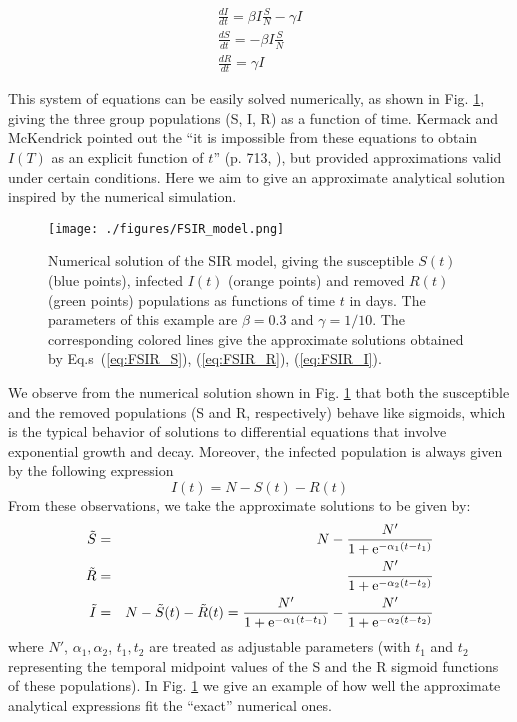 \documentclass[aps,preprint]{revtex4}
\newcommand{\eexp}{{\rm e}}
\newcommand{\Stild}{\tilde{S}}
\newcommand{\Rtild}{{\tilde R}}
\newcommand{\Itild}{{\tilde I}}
\begin{document}
\begin{eqnarray}
\frac{dI}{dt} = \beta I \frac{S}{N} - \gamma I  
\label{eq:SIR_I}
\\
\frac{dS}{dt} = - \beta I \frac{S}{N} 
\label{eq:SIR_S}
\\
\frac{dR}{dt} = \gamma I 
\label{eq:SIR_R}
\end{eqnarray}

This system of equations can be easily solved numerically, as shown in Fig. \ref{fig:FSIR_model}, 
giving the three group populations (S, I, R) as a function of time. 
Kermack and McKendrick pointed out the ``it is impossible from these equations 
to obtain $I(T)$ as an explicit function of $t$'' (p. 713, \cite{Kermack_1927}), 
but provided approximations valid under certain conditions. 
Here we aim to give an approximate analytical solution inspired by the 
numerical simulation.
\begin{figure}[h]
\texttt{[image: ./figures/FSIR\_model.png]}
\caption{
\small{
Numerical solution of the SIR model, giving the susceptible $S(t)$ (blue points), 
infected $I(t)$ (orange points)
and removed $R(t)$ (green points) populations as functions of time $t$ in days. 
The parameters of this example are $\beta=0.3$ and $\gamma = 1/10$. 
The corresponding colored lines give the approximate solutions obtained by Eq.s~(\ref{eq:FSIR_S}), 
(\ref{eq:FSIR_R}), (\ref{eq:FSIR_I}). 
}
}
\label{fig:FSIR_model}
\end{figure}

We observe from the numerical solution shown in Fig. \ref{fig:FSIR_model}
that both the susceptible and the removed populations (S and R, respectively) 
behave like sigmoids, which is the typical behavior of solutions to 
differential equations that involve exponential growth and decay. 
Moreover, the infected population is always given by the following expression
\begin{equation}
I(t) = N - S(t) - R(t)
\label{eq:infect-S-R}
\end{equation}
From these observations, we take the approximate solutions to be given by:
\begin{eqnarray}
\Stild & = & N - \frac{N'}{1+\eexp^{-\alpha_1(t-t_1)}} 
\label{eq:FSIR_S}
\\
\Rtild & = & \frac{N'}{1+\eexp^{-\alpha_2(t-t_2)}} 
\label{eq:FSIR_R}
\\
\Itild & = & N - \Stild(t) - \Rtild(t) =  \frac{N'}{1+\eexp^{-\alpha_1(t-t_1)}}
- \frac{N'}{1+\eexp^{-\alpha_2(t-t_2)}} 
\label{eq:FSIR_I}
\end{eqnarray}
where $N'$, $\alpha_1, \alpha_2$, $t_1, t_2$ are treated as adjustable 
parameters (with $t_1$  and $t_2$ representing the temporal midpoint values of the S and the R sigmoid functions of these populations).
In Fig. \ref{fig:FSIR_model} we give an example of how well the 
approximate analytical expressions fit the ``exact'' numerical ones.
\end{document}
